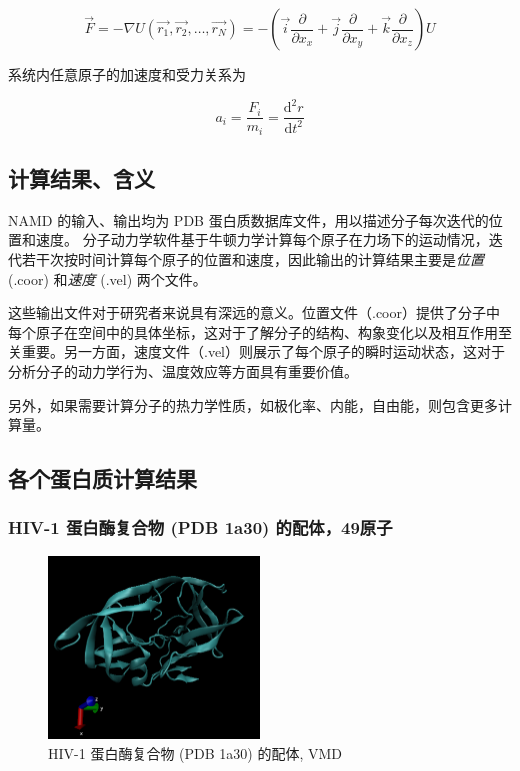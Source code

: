 \begin{equation}
    \vec{F} = -\nabla U (\vec{r_1}, \vec{r_2}, \dots, \vec{r_N}) = - \left( \vec{i} \frac{\partial}{\partial x_x} + \vec{j}\frac{\partial}{\partial x_y} + \vec{k} \frac{\partial}{\partial x_z}\right) U
\end{equation}

系统内任意原子的加速度和受力关系为\cite{易浩杰2019纳米静电喷射的分子动力学模拟研究}

\begin{equation}
    a_i = \frac{F_i}{m_i} = \frac{\mathrm{d}^2 r}{\mathrm{d} t^2}
\end{equation}

\subsection{计算结果、含义}

NAMD 的输入、输出均为 PDB 蛋白质数据库文件，用以描述分子每次迭代的位置和速度。
分子动力学软件基于牛顿力学计算每个原子在力场下的运动情况，迭代若干次按时间计算每个原子的位置和速度，因此输出的计算结果主要是\textit{位置} (.coor) 和\textit{速度} (.vel) 两个文件。

这些输出文件对于研究者来说具有深远的意义。位置文件（.coor）提供了分子中每个原子在空间中的具体坐标，这对于了解分子的结构、构象变化以及相互作用至关重要。另一方面，速度文件（.vel）则展示了每个原子的瞬时运动状态，这对于分析分子的动力学行为、温度效应等方面具有重要价值。

另外，如果需要计算分子的热力学性质，如极化率、内能，自由能，则包含更多计算量。


\subsection{各个蛋白质计算结果}

\subsubsection{HIV-1 蛋白酶复合物 (PDB 1a30) 的配体，49原子}

\begin{figure}[h]
    \centering
    \includegraphics[width=0.5\textwidth]{images/1A30.png}
    \caption{HIV-1 蛋白酶复合物 (PDB 1a30) 的配体, VMD}
    \label{fig:1a30}
\end{figure}


